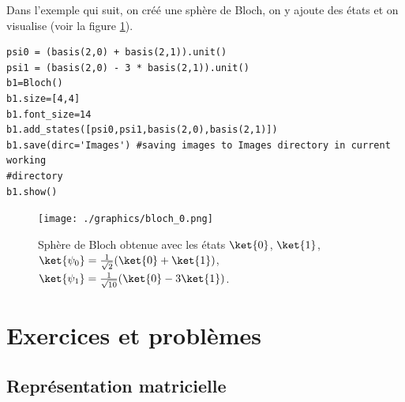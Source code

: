 Dans l'exemple qui suit, on créé une sphère de Bloch, on y ajoute des 
états et on visualise (voir la figure \ref{fig:bloch_0}).\\
\begin{lstlisting}[commentstyle=\scriptsize]
psi0 = (basis(2,0) + basis(2,1)).unit()
psi1 = (basis(2,0) - 3 * basis(2,1)).unit()
b1=Bloch()
b1.size=[4,4]
b1.font_size=14
b1.add_states([psi0,psi1,basis(2,0),basis(2,1)])
b1.save(dirc='Images') #saving images to Images directory in current working 
#directory
b1.show()
\end{lstlisting}
\begin{figure}[htbp]
\centering
 \texttt{[image: ./graphics/bloch\_0.png]}
 \caption{Sphère de Bloch obtenue avec les états $\ket{0}$, $\ket{1}$, 
$\ket{\psi_0}=\frac{1}{\sqrt{2}}(\ket{0}+\ket{1})$, 
$\ket{\psi_1}=\frac{1}{\sqrt{10}}(\ket{0}-3\ket{1})$.}
 \label{fig:bloch_0}
\end{figure}

\newpage


\section{Exercices et problèmes}

\subsection{Représentation matricielle}

